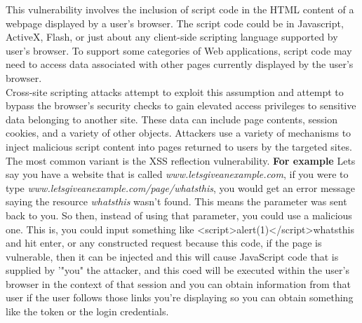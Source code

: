 \documentclass[12pt]{article}
\begin{document}
\begin{enumerate}
	This vulnerability involves the inclusion of script code in the HTML content of a webpage displayed by a user's browser. The script code could be in Javascript, ActiveX, Flash, or just about any client-side scripting language supported by user's browser. To support some categories of Web applications, script code may need to access data associated with other pages currently displayed by the user's browser. \\ Cross-site scripting attacks attempt to exploit this assumption and attempt to bypass the browser's security checks to gain elevated access privileges to sensitive data belonging to another site. These data can include page contents, session cookies, and a variety of other objects. Attackers use a variety of mechanisms to inject malicious script content into pages returned to users by the targeted sites. \\ The most common variant is the XSS reflection vulnerability. \textbf{For example} Lets say you have a website that is called \textit{www.letsgiveanexample.com}, if you were to type \textit{www.letsgiveanexample.com/page/whatsthis}, you would get an error message saying the resource \textit{whatsthis} wasn't found. This means the parameter was sent back to you. So then, instead of using that parameter, you could use a malicious one. This is, you could input something like <script>alert(1)</script>whatsthis and hit enter, or any constructed request because this code, if the page is vulnerable, then it can be injected and this will cause JavaScript code that is supplied by '"you" the attacker, and this coed will be executed within the user's browser in the context of that session and you can obtain information from that user if the user follows those links you're displaying so you can obtain something like the token or the login credentials. 

    
\end{enumerate}
\end{document}
